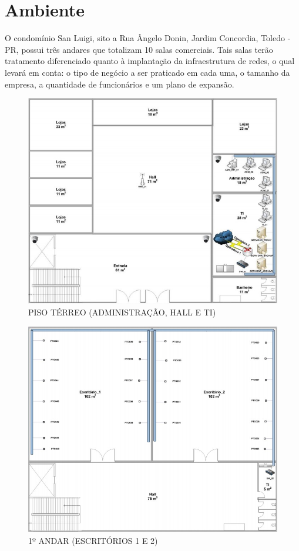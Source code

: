 \documentclass[	DIV=calc,%
							paper=a4,%
							fontsize=12pt,%
							onecolumn]{scrartcl}	 					%
\begin{document}
\section{Ambiente}

{\raggedright O condomínio San Luigi, sito a Rua Ângelo Donin, Jardim Concordia, Toledo - PR, possui três andares que totalizam 10 salas comerciais. Tais salas terão tratamento diferenciado quanto à
implantação da infraestrutura de redes, o qual levará em conta: o tipo de negócio a ser
praticado em cada uma, o tamanho da empresa, a quantidade de funcionários e um plano de expansão.
}

\begin{figure}[H]
  \centering
  \includegraphics[width=\textwidth]{terreo} 
  \caption{PISO TÉRREO (ADMINISTRAÇÃO, HALL E TI)}
  \label{fig:methodology}
\end{figure}

\begin{figure}[H]
  \centering
  \includegraphics[width=\textwidth]{piso1} 
  \caption{1º ANDAR (ESCRITÓRIOS 1 E 2)}
  \label{fig:methodology}
\end{figure}
\end{document}
